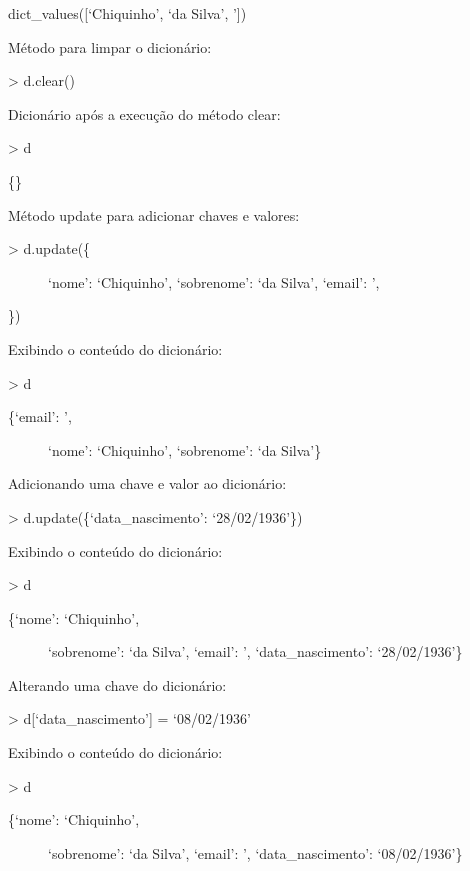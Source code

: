 \documentclass[letterpaper,10pt,brazil]{sphinxmanual}
\begin{document}
dict\_values({[}‘Chiquinho’, ‘da Silva’, ’{]})

Método para limpar o dicionário:

\textgreater{} d.clear()

Dicionário após a execução do método clear:

\textgreater{} d

\{\}

Método update para adicionar chaves e valores:
\begin{description}
\item[{\textgreater{} d.update(\{}] \leavevmode
‘nome’: ‘Chiquinho’,
‘sobrenome’: ‘da Silva’,
‘email’: ’,

\end{description}

\})

Exibindo o conteúdo do dicionário:

\textgreater{} d
\begin{description}
\item[{\{‘email’: ’,}] \leavevmode
‘nome’: ‘Chiquinho’,
‘sobrenome’: ‘da Silva’\}

\end{description}

Adicionando uma chave e valor ao dicionário:

\textgreater{} d.update(\{‘data\_nascimento’: ‘28/02/1936’\})

Exibindo o conteúdo do dicionário:

\textgreater{} d
\begin{description}
\item[{\{‘nome’: ‘Chiquinho’,}] \leavevmode
‘sobrenome’: ‘da Silva’,
‘email’: ’,
‘data\_nascimento’: ‘28/02/1936’\}

\end{description}

Alterando uma chave do dicionário:

\textgreater{} d{[}‘data\_nascimento’{]} = ‘08/02/1936’

Exibindo o conteúdo do dicionário:

\textgreater{} d
\begin{description}
\item[{\{‘nome’: ‘Chiquinho’,}] \leavevmode
‘sobrenome’: ‘da Silva’,
‘email’: ’,
‘data\_nascimento’: ‘08/02/1936’\}

\end{description}
\end{document}
